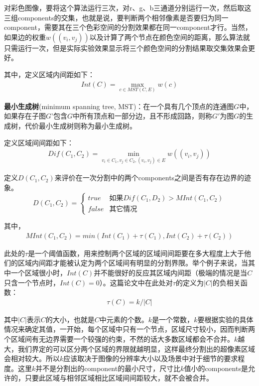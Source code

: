 \documentclass[12pt]{article}
\begin{document}
对彩色图像，要将这个算法运行三次，对r、g、b三通道分别运行一次，然后取这三组components的交集，也就是说，要判断两个相邻像素是否要归为同一component，需要其在三个色彩空间的分割效果都在同一component才行。当然，如果边的权重$w((v_i, v_j))$以及计算了两个节点在颜色空间的距离，那么算法就只需运行一次，但是实际实验效果显示将三个颜色空间的分割结果取交集效果会更好。


其中，定义区域内间距如下：
\begin{align}
Int(C) = \max_{c \in MST(C, E)}w(c)
\end{align}

\textbf{最小生成树}(minimum spanning tree, MST)：在一个具有几个顶点的连通图$G$中，如果存在子图$G$'包含$G$中所有顶点和一部分边，且不形成回路，则称$G'$为图$G$的生成树，代价最小生成树则称为最小生成树。

定义区域间间距如下：
\begin{align}
Dif(C_1, C_2) = \min_{v_i \in C_1, v_j \in C_2, (v_i, v_j)\in E}w((v_i, v_j))
\end{align}

定义$D(C_1, C_2)$来评价在一次分割中的两个components之间是否有存在边界的迹象。
\begin{equation}
 D(C_1, C_2)= \left\{
    \begin{array}{rl}
      true & \text{如果} Dif(C_1, D_2) > MInt(C_1, C_2)\\
      false & \text{其它情况}
    \end{array} \right.
\end{equation}

其中，
\begin{align}
MInt(C_1, C_2) = min(Int(C_1)+\tau(C_1), Int(C_2)+\tau(C_2))
\end{align}

此处的$\tau$是一个阈值函数，用来控制两个区域的区域间间距要在多大程度上大于他们的区域内间距才能被认定为两个区域间有明显的分割界限。举个例子来说，当其中一个区域很小时，$Int(C)$并不能很好的反应其区域内间距（极端的情况是当$C$只含一个节点时，$Int(C)=0$）。这篇论文中在此处对$\tau$的定义为$|C|$的负相关函数：
\begin{align}
\tau(C) = k/|C|
\end{align}

其中$|C|$表示$C$的大小，也就是$C$中元素的个数。$k$是一个常数，$k$要根据实验的具体情况来确定其值，一开始，每个区域中只有一个节点，区域尺寸较小，因而判断两个区域间有无边界需要一个较强的约束，不然的话大多数区域都会不合并。$k$越大，我们界定的可以区分两个区域的界限就越明显，这样最终分割出的超像素区域会相对较大。所以$k$应该取决于图像的分辨率大小以及场景中对于细节的要求程度。这里$k$并不是分割出的component的最小尺寸，尺寸比$k$值小的components是允许的，只要此区域与相邻区域相比区域间间距较大，就不会被合并。
\end{document}
